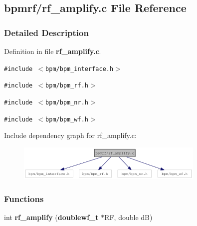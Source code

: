 \subsection{bpmrf/rf\_\-amplify.c File Reference}
\label{rf__amplify_8c}


\subsubsection{Detailed Description}


Definition in file {\bf rf\_\-amplify.c}.

{\tt \#include $<$bpm/bpm\_\-interface.h$>$}\par
{\tt \#include $<$bpm/bpm\_\-rf.h$>$}\par
{\tt \#include $<$bpm/bpm\_\-nr.h$>$}\par
{\tt \#include $<$bpm/bpm\_\-wf.h$>$}\par


Include dependency graph for rf\_\-amplify.c:\nopagebreak
\begin{figure}[H]
\begin{center}
\leavevmode
\includegraphics[width=254pt]{rf__amplify_8c__incl}
\end{center}
\end{figure}
\subsubsection*{Functions}
\begin{CompactItemize}
\item 
int {\bf rf\_\-amplify} ({\bf doublewf\_\-t} $\ast$RF, double dB)
\end{CompactItemize}
